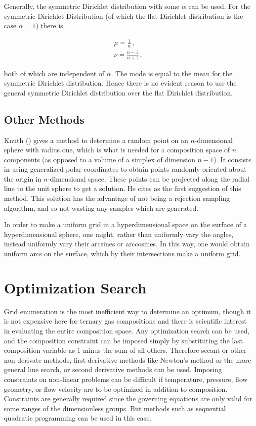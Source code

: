 \documentclass{article}
\begin{document}
Generally, the symmetric Dirichlet distribution with some $\alpha$ can be used.
For the symmetric Dirichlet Distribution (of which the flat Dirichlet
distribution is the case $\alpha = 1$) there is

\begin{align}
\mu = \frac 1n \,,\\
\nu = \frac{n-1}{n+1} \,,
\end{align}

both of which are independent of $\alpha$. The mode is equal to the mean
for the symmetric Dirichlet distribution. Hence there is no evident
reason to use the general symmetric Dirichlet distribution over the flat
Dirichlet distribution.

\subsection{Other Methods}

Knuth (\cite[\S 3.4.1]{taocp}) gives a method to determine a random point on an
$n$-dimensional sphere with radius one, which is what is needed for a
composition space of $n$ components (as opposed to a volume of a simplex of
dimension $n-1$). It consists in using generalized polar coordinates to obtain
points randomly oriented about the origin in $n$-dimensional space. These
points can be projected along the radial line to the unit sphere to get a
solution. He cites \cite[302]{brownmodernmathematics1956} as the first
suggestion of this method.  This solution has the advantage of not being a
rejection sampling algorithm, and so not wasting any samples which are
generated.

In order to make a uniform grid in a hyperdimensional space on the surface of a
hyperdimensional sphere, one might, rather than uniformly vary the angles,
instead uniformly vary their arcsines or arccosines. In this way, one would
obtain uniform arcs on the surface, which by their intersections make a uniform
grid.

\section{Optimization Search}

Grid enumeration is the most inefficient way to determine an optimum, though it
is not expensive here for ternary gas compositions and there is scientific
interest in evaluating the entire composition space. Any optimization search
can be used, and the composition constraint can be imposed simply by
substituting the last composition variable as 1 minus the sum of all others.
Therefore secant or other non-derivate methods, first derivative methods like
Newton's method or the more general line search, or second derivative methods
can be used. Imposing constraints on non-linear problems can be difficult if
temperature, pressure, flow geometry, or flow velocity are to be optimized in
addition to composition. Constraints are generally required since the governing
equations are only valid for some ranges of the dimensionless groups. But
methods such as sequential quadratic programming can be used in this case.
\end{document}

